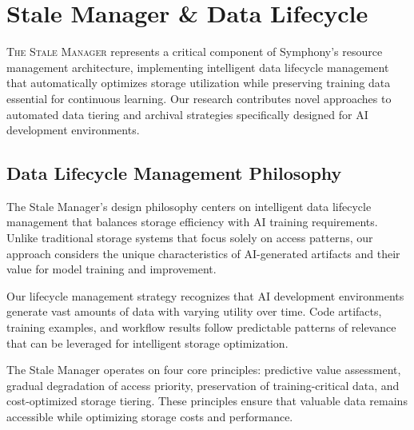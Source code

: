 
\section*{Stale Manager \& Data Lifecycle}

\vspace{0.5cm}
\lettrine{T}{he Stale Manager} represents a critical component of Symphony's resource management architecture, implementing intelligent data lifecycle management that automatically optimizes storage utilization while preserving training data essential for continuous learning. Our research contributes novel approaches to automated data tiering and archival strategies specifically designed for AI development environments.

\subsection*{Data Lifecycle Management Philosophy}

The Stale Manager's design philosophy centers on intelligent data lifecycle management that balances storage efficiency with AI training requirements. Unlike traditional storage systems that focus solely on access patterns, our approach considers the unique characteristics of AI-generated artifacts and their value for model training and improvement.

Our lifecycle management strategy recognizes that AI development environments generate vast amounts of data with varying utility over time. Code artifacts, training examples, and workflow results follow predictable patterns of relevance that can be leveraged for intelligent storage optimization.

\begin{infobox}[title=Data Lifecycle Principles]
The Stale Manager operates on four core principles: predictive value assessment, gradual degradation of access priority, preservation of training-critical data, and cost-optimized storage tiering. These principles ensure that valuable data remains accessible while optimizing storage costs and performance.
\end{infobox}

